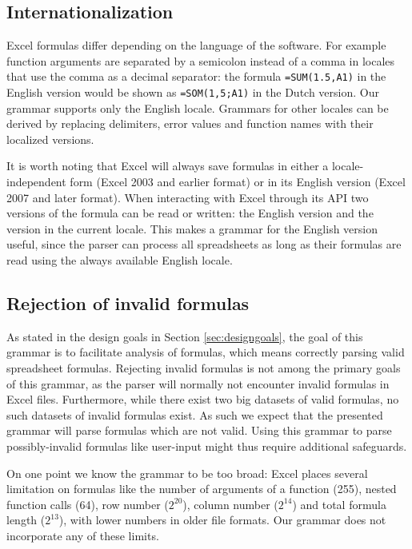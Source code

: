 \documentclass[conference]{IEEEtran}
\begin{document}
\subsection{Internationalization}

Excel formulas differ depending on the language of the software. For example function arguments are separated by a semicolon instead of a comma in locales that use the comma as a decimal separator: the formula \texttt{=SUM(1.5,A1)} in the English version would be shown as \texttt{=SOM(1,5;A1)} in the Dutch version.
Our grammar supports only the English locale.
Grammars for other locales can be derived by replacing delimiters, error values and function names with their localized versions.

It is worth noting that Excel will always save formulas in either a locale-independent form (Excel 2003 and earlier format) or in its English version (Excel 2007 and later format). When interacting with Excel through its API two versions of the formula can be read or written: the English version and the version in the current locale.
This makes a grammar for the English version useful, since the parser can process all spreadsheets as long as their formulas are read using the always available English locale.

\subsection{Rejection of invalid formulas}

As stated in the design goals in Section \ref{sec:designgoals}, the goal of this grammar is to facilitate analysis of formulas, which means correctly parsing valid spreadsheet formulas.
Rejecting invalid formulas is not among the primary goals of this grammar, as the parser will normally not encounter invalid formulas in Excel files.
Furthermore, while there exist two big datasets of valid formulas, no such datasets of invalid formulas exist.
As such we expect that the presented grammar will parse formulas which are not valid.
Using this grammar to parse possibly-invalid formulas like user-input might thus require additional safeguards.

On one point we know the grammar to be too broad: Excel places several limitation on formulas like the number of arguments of a function (255), nested function calls (64), row number ($2^{20}$), column number ($2^{14}$) and total formula length ($2^{13}$), with lower numbers in older file formats.
Our grammar does not incorporate any of these limits.
\end{document}

